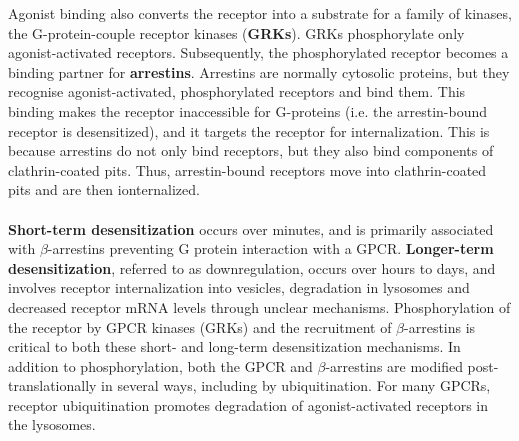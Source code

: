 \documentclass{book}
\begin{document}
Agonist binding also converts the receptor into a substrate for a family of kinases, the G-protein-couple receptor kinases (\textbf{GRKs}).
GRKs phosphorylate only agonist-activated receptors.
Subsequently, the phosphorylated receptor becomes a binding partner for \textbf{arrestins}.
Arrestins are normally cytosolic proteins, but they recognise agonist-activated, phosphorylated receptors and bind them. 
This binding makes the receptor inaccessible for G-proteins (i.e. the arrestin-bound receptor is desensitized), and it targets the receptor for internalization. 
This is because arrestins do not only bind receptors, but they also bind components of clathrin-coated pits.
Thus, arrestin-bound receptors move into clathrin-coated pits and are then ionternalized.
\\
\\
\textbf{Short-term desensitization} occurs over minutes, and is primarily associated with $\beta$-arrestins preventing G protein interaction with a GPCR. 
\textbf{Longer-term desensitization}, referred to as downregulation, occurs over hours to days, and involves receptor internalization into vesicles, degradation in lysosomes and decreased receptor mRNA levels through unclear mechanisms. 
Phosphorylation of the receptor by GPCR kinases (GRKs) and the recruitment of $\beta$-arrestins is critical to both these short- and long-term desensitization mechanisms. 
In addition to phosphorylation, both the GPCR and $\beta$-arrestins are modified post-translationally in several ways, including by ubiquitination. 
For many GPCRs, receptor ubiquitination promotes degradation of agonist-activated receptors in the lysosomes. 
\end{document}
